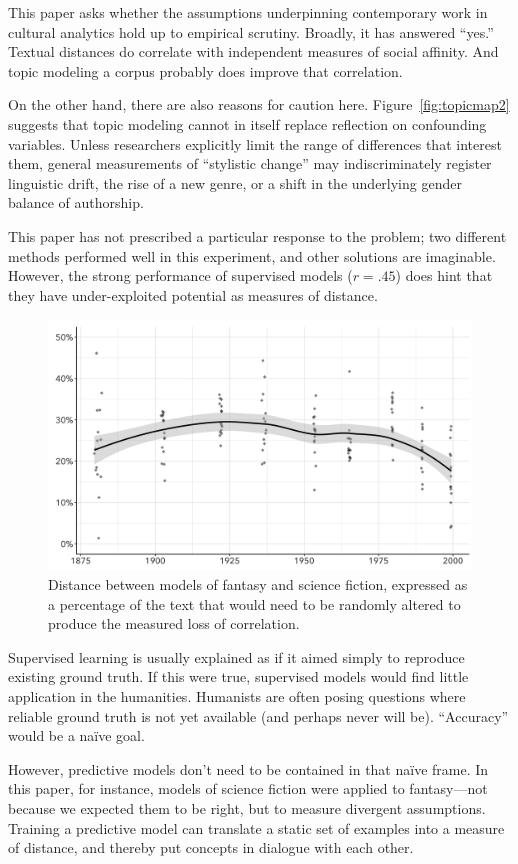 \documentclass[11pt]{article}
\begin{document}
This paper asks whether the assumptions underpinning contemporary work in cultural analytics hold up to empirical scrutiny. Broadly, it has answered ``yes.'' Textual distances do correlate with independent measures of social affinity. And topic modeling a corpus probably does improve that correlation.

On the other hand, there are also reasons for caution here. Figure~\ref{fig:topicmap2} suggests that topic modeling cannot in itself replace reflection on confounding variables. Unless researchers explicitly limit the range of differences that interest them, general measurements of ``stylistic change'' may indiscriminately register linguistic drift, the rise of a new genre, or a shift in the underlying gender balance of authorship.

This paper has not prescribed a particular response to the problem; two different methods performed well in this experiment, and other solutions are imaginable. However, the strong performance of supervised models ($r = .45$) does hint that they have under-exploited potential as measures of distance. 

\begin{figure}
  \centering
  \includegraphics[width=.44\textwidth]{FSFcomparison.png}
  \caption{\label{fig:fsf}Distance between models of fantasy and science fiction, expressed as a percentage of the text that would need to be randomly altered to produce the measured loss of correlation.}
\end{figure}

Supervised learning is usually explained as if it aimed simply to reproduce existing ground truth. If this were true, supervised models would find little application in the humanities. Humanists are often posing questions where reliable ground truth is not yet available (and perhaps never will be). ``Accuracy'' would be a na\"ive goal.

However, predictive models don't need to be contained in that na\"ive frame. In this paper, for instance, models of science fiction were applied to fantasy---not because we expected them to be right, but to measure divergent assumptions. Training a predictive model can translate a static set of examples into a measure of distance, and thereby put concepts in dialogue with each other.
\end{document}
